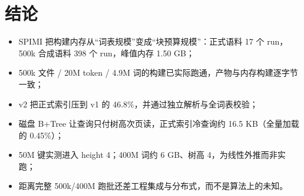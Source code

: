 \section{结论}

\begin{itemize}
  \item SPIMI 把构建内存从“词表规模”变成“块预算规模”：正式语料 17 个 run，500k 合成语料 398 个 run，峰值内存 1.50 GB；
  \item 500k 文件 / 20M token / 4.9M 词的构建已实际跑通，产物与内存构建逐字节一致；
  \item v2 把正式索引压到 v1 的 46.8\%，并通过独立解析与全词表校验；
  \item 磁盘 B+Tree 让查询只付树高次页读，正式索引冷查询约 16.5 KB（全量加载的 0.45\%）；
  \item 50M 键实测进入 height 4；400M 词约 6 GB、树高 4，为线性外推而非实跑；
  \item 距离完整 500k/400M 跑批还差工程集成与分布式，而不是算法上的未知。
\end{itemize}


